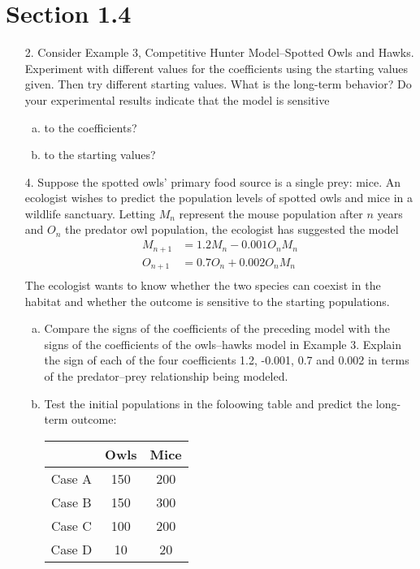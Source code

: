 \documentclass[10pt]{report}
\begin{document}
\section*{Section 1.4}
\begin{enumerate}
	\item [2.]
	Consider Example 3, Competitive Hunter Model--Spotted Owls and Hawks. Experiment with different values for the coefficients using the starting values given. Then try different starting values. What is the long-term behavior? Do your experimental results indicate that the model is sensitive
	\begin{enumerate}[a.]
		\item 
		to the coefficients?
		
		\item 
		to the starting values?
	\end{enumerate} 

	\item [4.]
	Suppose the spotted owls' primary food source is a single prey: mice. An ecologist wishes to predict the population levels of spotted owls and mice in a wildlife sanctuary. Letting $M_n$ represent the mouse population after $n$ years and $O_n$ the predator owl population, the ecologist has suggested the model
	\begin{align*}
		M_{n+1} &= 1.2 M_n - 0.001 O_n M_n\\
		O_{n+1} &= 0.7 O_n + 0.002 O_n M_n\\
	\end{align*}
	The ecologist wants to know whether the two species can coexist in the habitat and whether the outcome is sensitive to the starting populations.
	\begin{enumerate}[a.]
		\item 
		Compare the signs of the coefficients of the preceding model with the signs of the coefficients of the owls--hawks model in Example 3. Explain the sign of each of the four coefficients 1.2, -0.001, 0.7 and 0.002 in terms of the predator--prey relationship being modeled.
		
		\item 
		Test the initial populations in the foloowing table and predict the long-term outcome:
		\begin{table}[H]
			\centering
			\begin{tabular}{*{3}{c}} 
				\toprule
				 & Owls & Mice\\ \midrule
				Case A & 150 & 200 \\
				Case B & 150 & 300 \\
				Case C & 100 & 200 \\
				Case D & 10 & 20 \\
				\bottomrule
			\end{tabular}
		\end{table}
		

\end{enumerate}
\end{enumerate}
\end{document}
